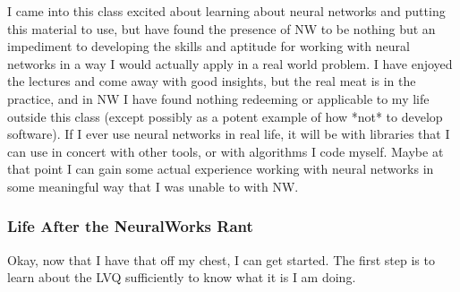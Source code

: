 \documentclass[12pt]{article}
\begin{document}
I came into this class excited about learning about neural networks and putting this material to use, but have found the presence of NW to be nothing but an impediment to developing the skills and aptitude for working with neural networks in a way I would actually apply in a real world problem.  I have enjoyed the lectures and come away with good insights, but the real meat is in the practice, and in NW I have found nothing redeeming or applicable to my life outside this class (except possibly as a potent example of how *not* to develop software).  If I ever use neural networks in real life, it will be with libraries that I can use in concert with other tools, or with algorithms I code myself.  Maybe at that point I can gain some actual experience working with neural networks in some meaningful way that I was unable to with NW.

\subsubsection{Life After the NeuralWorks Rant}

Okay, now that I have that off my chest, I can get started.  The first step is to learn about the LVQ sufficiently to know what it is I am doing.  
\end{document}
